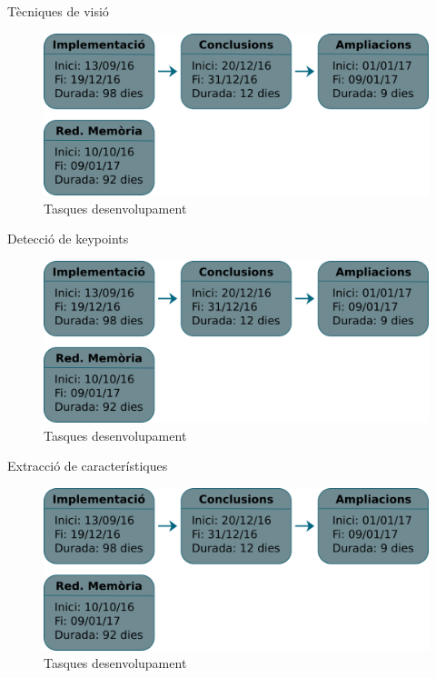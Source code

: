 \documentclass[xcolor=table]{beamer}
\begin{document}
	\begin{frame}{Tècniques de visió}
		\centering
		\begin{figure}
			\includegraphics[width=\textwidth-1cm]{tasques}
			\vspace{0.2cm}
			\caption{Tasques desenvolupament}
		\end{figure}
	\end{frame}

	\begin{frame}{Detecció de keypoints}
		\centering
		\begin{figure}
			\includegraphics[width=\textwidth-1cm]{tasques}
			\vspace{0.2cm}
			\caption{Tasques desenvolupament}
		\end{figure}
	\end{frame}

	\begin{frame}{Extracció de característiques}
		\centering
		\begin{figure}
			\includegraphics[width=\textwidth-1cm]{tasques}
			\vspace{0.2cm}
			\caption{Tasques desenvolupament}
		\end{figure}
	\end{frame}
\end{document}

